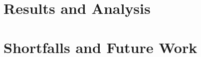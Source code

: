 \documentclass[12pt,letterpaper]{article}
\begin{document}
\section{Results and Analysis}

\section{Shortfalls and Future Work}


\end{document}
